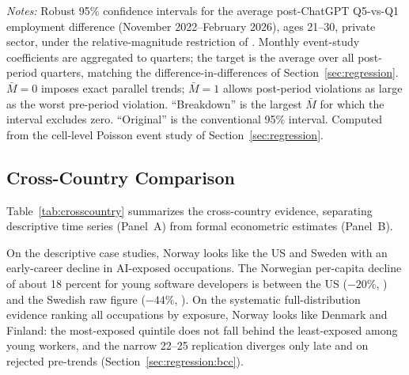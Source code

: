 \documentclass[12pt]{article}
\begin{document}
\begin{table}[tp]
  \centering
  \caption{HonestDiD sensitivity of the Q5-vs-Q1 employment effect to violations of parallel trends, ages 21--30, private sector.}
  \label{tab:honest_did}
  
  \begin{minipage}{\textwidth}\footnotesize\textit{Notes:} Robust 95\% confidence intervals for the average post-ChatGPT Q5-vs-Q1 employment difference (November 2022--February 2026), ages 21--30, private sector, under the relative-magnitude restriction of \citet{rambachan2023}. Monthly event-study coefficients are aggregated to quarters; the target is the average over all post-period quarters, matching the difference-in-differences of Section~\ref{sec:regression}. $\bar{M}=0$ imposes exact parallel trends; $\bar{M}=1$ allows post-period violations as large as the worst pre-period violation. ``Breakdown'' is the largest $\bar{M}$ for which the interval excludes zero. ``Original'' is the conventional 95\% interval. Computed from the cell-level Poisson event study of Section~\ref{sec:regression}.\end{minipage}
\end{table}


\subsection{Cross-Country Comparison}\label{sec:discussion:crosscountry}

Table~\ref{tab:crosscountry} summarizes the cross-country evidence, separating descriptive time series (Panel~A) from formal econometric estimates (Panel~B).

On the descriptive case studies, Norway looks like the US and Sweden with an early-career decline in AI-exposed occupations. The Norwegian per-capita decline of about 18 percent for young software developers is between the US ($-20\%$, \citealp{brynjolfsson2025}) and the Swedish raw figure ($-44\%$, \citealp{lodefalk2026}). On the systematic full-distribution evidence ranking all occupations by exposure, Norway looks like Denmark and Finland: the most-exposed quintile does not fall behind the least-exposed among young workers, and the narrow 22--25 replication diverges only late and on rejected pre-trends (Section~\ref{sec:regression:bcc}).
\end{document}
